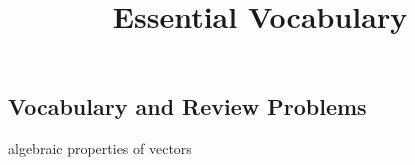 \documentclass{ximera}
\title{Essential Vocabulary} \license{CC BY-NC-SA 4.0}
\begin{document}
\begin{abstract}
\end{abstract}
\maketitle


\begin{onlineOnly}
\section*{Vocabulary and Review Problems}
\end{onlineOnly}


algebraic properties of vectors
\end{document}
